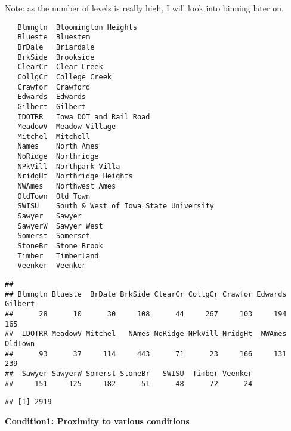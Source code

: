 \documentclass[]{article}
\newenvironment{Shaded}{\begin{snugshade}}{\end{snugshade}}
\newcommand{\KeywordTok}[1]{\textcolor[rgb]{0.13,0.29,0.53}{\textbf{#1}}}
\newcommand{\StringTok}[1]{\textcolor[rgb]{0.31,0.60,0.02}{#1}}
\newcommand{\CommentTok}[1]{\textcolor[rgb]{0.56,0.35,0.01}{\textit{#1}}}
\newcommand{\OperatorTok}[1]{\textcolor[rgb]{0.81,0.36,0.00}{\textbf{#1}}}
\newcommand{\NormalTok}[1]{#1}
\begin{document}
Note: as the number of levels is really high, I will look into binning
later on.

\begin{verbatim}
   Blmngtn  Bloomington Heights
   Blueste  Bluestem
   BrDale   Briardale
   BrkSide  Brookside
   ClearCr  Clear Creek
   CollgCr  College Creek
   Crawfor  Crawford
   Edwards  Edwards
   Gilbert  Gilbert
   IDOTRR   Iowa DOT and Rail Road
   MeadowV  Meadow Village
   Mitchel  Mitchell
   Names    North Ames
   NoRidge  Northridge
   NPkVill  Northpark Villa
   NridgHt  Northridge Heights
   NWAmes   Northwest Ames
   OldTown  Old Town
   SWISU    South & West of Iowa State University
   Sawyer   Sawyer
   SawyerW  Sawyer West
   Somerst  Somerset
   StoneBr  Stone Brook
   Timber   Timberland
   Veenker  Veenker
\end{verbatim}

\begin{Shaded}
\end{Shaded}

\begin{verbatim}
## 
## Blmngtn Blueste  BrDale BrkSide ClearCr CollgCr Crawfor Edwards Gilbert 
##      28      10      30     108      44     267     103     194     165 
##  IDOTRR MeadowV Mitchel   NAmes NoRidge NPkVill NridgHt  NWAmes OldTown 
##      93      37     114     443      71      23     166     131     239 
##  Sawyer SawyerW Somerst StoneBr   SWISU  Timber Veenker 
##     151     125     182      51      48      72      24
\end{verbatim}

\begin{Shaded}
\end{Shaded}

\begin{verbatim}
## [1] 2919
\end{verbatim}

\textbf{Condition1: Proximity to various conditions}
\end{document}
